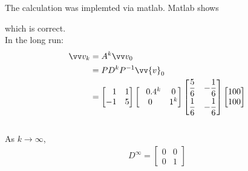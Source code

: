\documentclass[10pt,a4paper]{article}
\numberwithin{equation}{section}
\begin{document}
				\noindent The calculation was implemted via matlab.
				Matlab shows
				
				which is correct.
				\\
				
				\noindent In the long run:\\
			
				\begin{align*}
				\vv v_{k} & = A^k\vv v_{0}\\&= PD^{k}P^{-1} \vv{v}_0\\&=\begin{bmatrix}
				\phantom{-}1 & 1 \\ -1 & 5
				\end{bmatrix}
				\begin{bmatrix}
				\phantom{-}0.4^k & 0 \\ 0 & 1^k
				\end{bmatrix}	
				\begin{bmatrix}
				\dfrac{5}{6} & -\dfrac{1}{6} \\[6pt]
				\dfrac{1}{6} & -\dfrac{1}{6}
				\end{bmatrix}
				\begin{bmatrix}
				100 \\ 100
				\end{bmatrix}
				\end{align*}
			\\
			
			\noindent As $k \rightarrow \infty$,
			\begin{align*}
			D^\infty = \begin{bmatrix} 0 & 0 \\ 0 & 1
			\end{bmatrix}
			\end{align*}
			
\end{document}
